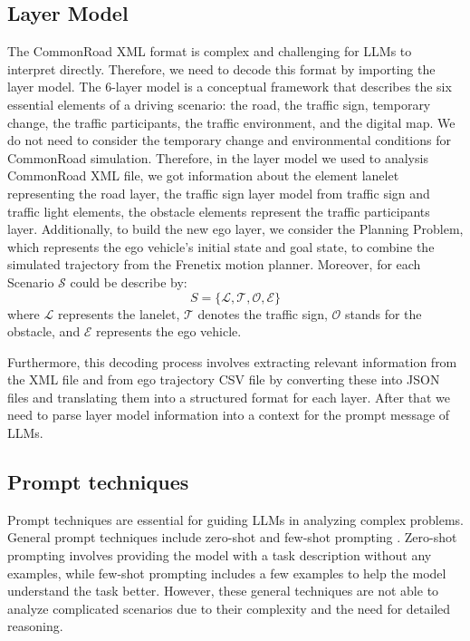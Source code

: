 \subsection{Layer Model}
The CommonRoad XML format is complex and challenging for LLMs to interpret directly. Therefore, we need to decode this format by importing the layer model. The 6-layer model is a conceptual framework that describes the six essential elements of a driving scenario: the road, the traffic sign, temporary change, the traffic participants, the traffic environment, and the digital map. We do not need to consider the temporary change and environmental conditions for CommonRoad simulation. Therefore, in the layer model we used to analysis CommonRoad XML file, we got information about the element lanelet representing the road layer, the traffic sign layer model from traffic sign and traffic light elements, the obstacle elements represent the traffic participants layer. Additionally, to build the new ego layer, we consider the Planning Problem, which represents the ego vehicle's initial state and goal state, to combine the simulated trajectory from the Frenetix motion planner.
Moreover, for each Scenario $\mathcal{S}$ could be describe by:
\begin{equation}
    S = \{\mathcal{L}, \mathcal{T}, \mathcal{O}, \mathcal{E}\}
\end{equation}
where $\mathcal{L}$ represents the lanelet, $\mathcal{T}$ denotes the traffic sign, $\mathcal{O}$ stands for the obstacle, and $\mathcal{E}$ represents the ego vehicle.

Furthermore, this decoding process involves extracting relevant information from the XML file and from ego trajectory CSV file by converting these into JSON files and translating them into a structured format for each layer.
After that we need to parse  layer model information into a context for the prompt message of LLMs.

\subsection{Prompt techniques}
Prompt techniques are essential for guiding LLMs in analyzing complex problems. General prompt techniques include zero-shot\cite{wei2021finetuned} and few-shot prompting \cite{touvron2023llama}. Zero-shot prompting involves providing the model with a task description without any examples, while few-shot prompting includes a few examples to help the model understand the task better. However, these general techniques are not able to analyze complicated scenarios due to their complexity and the need for detailed reasoning. 

